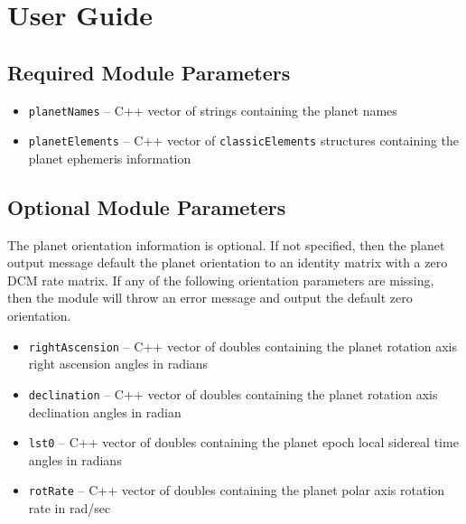 
\section{User Guide}
\subsection{Required Module Parameters}
\begin{itemize}
	\item {\tt planetNames} --  C++ vector of strings containing the planet names
	\item {\tt planetElements} --  C++ vector of {\tt classicElements} structures containing the planet ephemeris information
\end{itemize}


\subsection{Optional Module Parameters}
The planet orientation information is optional.  If not specified, then the planet output message default the planet orientation to an identity matrix with a zero DCM rate matrix.  If any of the following orientation parameters are missing, then the module will throw an error message and output the default zero orientation.

\begin{itemize}
	\item {\tt rightAscension} --  C++ vector of doubles containing the planet rotation axis right ascension angles in radians
	\item {\tt declination} --  C++ vector of doubles containing the planet rotation axis declination angles in radian
	\item {\tt lst0} --  C++ vector of doubles containing the planet epoch local sidereal time angles in radians
	\item {\tt rotRate} --  C++ vector of doubles containing the planet polar axis rotation rate in rad/sec
\end{itemize}
